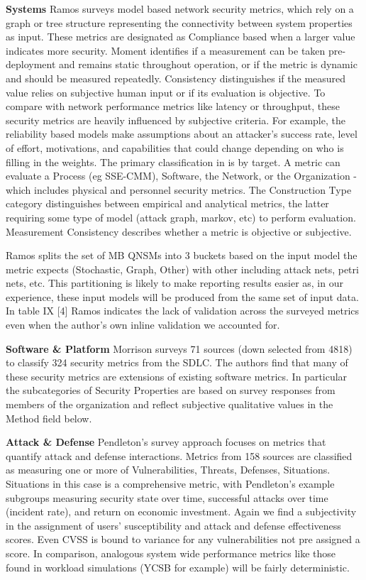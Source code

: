 \textbf{Systems} Ramos\cite{Ramos_Lazar_Filho_Rodrigues_2017} surveys model based network security metrics, which rely on a graph or tree structure representing the connectivity between system properties as input. These metrics are designated as Compliance based when a larger value indicates more security. Moment identifies if a measurement can be taken pre-deployment and remains static throughout operation, or if the metric is dynamic and should be measured repeatedly. Consistency distinguishes if the measured value relies on subjective human input or if its evaluation is objective. To compare with network performance metrics like latency or throughput, these security metrics are heavily influenced by subjective criteria. For example, the reliability based models make assumptions about an attacker’s success rate, level of effort, motivations, and capabilities that could change depending on who is filling in the weights. The primary classification in \cite{Ramos_Lazar_Filho_Rodrigues_2017} is by target. A metric can evaluate a Process (eg SSE-CMM), Software, the Network, or the Organization - which includes physical and personnel security metrics. The Construction Type category distinguishes between empirical and analytical metrics, the latter requiring some type of model (attack graph, markov, etc)  to perform evaluation. Measurement Consistency describes whether a metric is objective or subjective. 

Ramos splits the set of MB QNSMs into 3 buckets based on the input model the metric expects (Stochastic, Graph, Other) with other including attack nets, petri nets, etc. This partitioning is likely to make reporting results easier as, in our experience, these input models will be produced from the same set of input data. In table IX [4] Ramos indicates the lack of validation across the surveyed metrics even when the author’s own inline validation we accounted for. 


\textbf{Software \& Platform } Morrison\cite{Morrison_Moye_Pandita_Williams_2018} surveys 71 sources (down selected from 4818) to classify 324 security metrics from the SDLC. The authors find that many of these security metrics are extensions of existing software metrics. In particular the subcategories of Security Properties are based on survey responses from members of the organization and reflect subjective qualitative values in the Method field below. 

\textbf{Attack \& Defense} Pendleton’s survey\cite{Pendleton_Garcia-Lebron_Cho_Xu_2016} approach focuses on metrics that quantify attack and defense interactions. Metrics from 158 sources are classified as measuring one or more of Vulnerabilities, Threats, Defenses, Situations. Situations in this case is a comprehensive metric, with Pendleton’s example subgroups measuring security state over time, successful attacks over time (incident rate), and return on economic investment. Again we find a subjectivity in the  assignment of users’ susceptibility and attack and defense effectiveness scores. Even CVSS is bound to variance for any vulnerabilities not pre assigned a score. In comparison, analogous system wide performance metrics like those found in workload simulations (YCSB for example) will be fairly deterministic.

